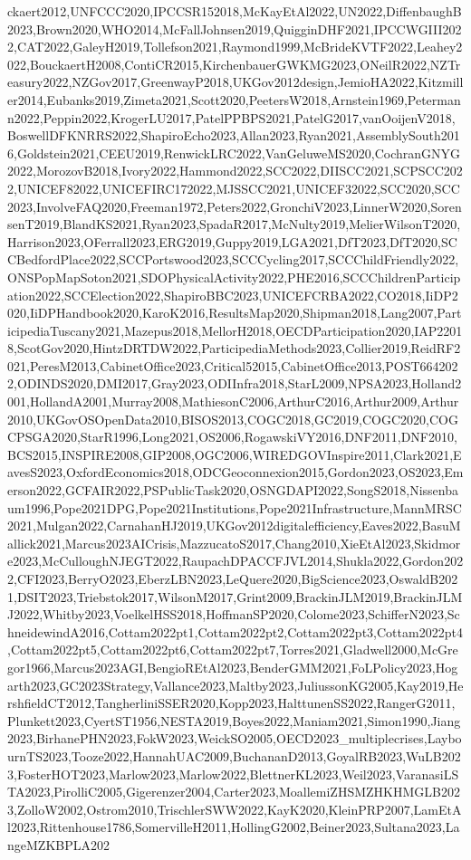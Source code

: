 \documentclass[a4paper]{article} %
\begin{document}
\begin{refsection}
ckaert2012,UNFCCC2020,IPCCSR152018,McKayEtAl2022,UN2022,DiffenbaughB2023,Brown2020,WHO2014,McFallJohnsen2019,QuigginDHF2021,IPCCWGIII2022,CAT2022,GaleyH2019,Tollefson2021,Raymond1999,McBrideKVTF2022,Leahey2022,BouckaertH2008,ContiCR2015,KirchenbauerGWKMG2023,ONeilR2022,NZTreasury2022,NZGov2017,GreenwayP2018,UKGov2012design,JemioHA2022,Kitzmiller2014,Eubanks2019,Zimeta2021,Scott2020,PeetersW2018,Arnstein1969,Petermann2022,Peppin2022,KrogerLU2017,PatelPPBPS2021,PatelG2017,vanOoijenV2018,BoswellDFKNRRS2022,ShapiroEcho2023,Allan2023,Ryan2021,AssemblySouth2016,Goldstein2021,CEEU2019,RenwickLRC2022,VanGeluweMS2020,CochranGNYG2022,MorozovB2018,Ivory2022,Hammond2022,SCC2022,DIISCC2021,SCPSCC2022,UNICEF82022,UNICEFIRC172022,MJSSCC2021,UNICEF32022,SCC2020,SCC2023,InvolveFAQ2020,Freeman1972,Peters2022,GronchiV2023,LinnerW2020,SorensenT2019,BlandKS2021,Ryan2023,SpadaR2017,McNulty2019,MelierWilsonT2020,Harrison2023,OFerrall2023,ERG2019,Guppy2019,LGA2021,DfT2023,DfT2020,SCCBedfordPlace2022,SCCPortswood2023,SCCCycling2017,SCCChildFriendly2022,ONSPopMapSoton2021,SDOPhysicalActivity2022,PHE2016,SCCChildrenParticipation2022,SCCElection2022,ShapiroBBC2023,UNICEFCRBA2022,CO2018,IiDP2020,IiDPHandbook2020,KaroK2016,ResultsMap2020,Shipman2018,Lang2007,ParticipediaTuscany2021,Mazepus2018,MellorH2018,OECDParticipation2020,IAP22018,ScotGov2020,HintzDRTDW2022,ParticipediaMethods2023,Collier2019,ReidRF2021,PeresM2013,CabinetOffice2023,Critical52015,CabinetOffice2013,POST6642022,ODINDS2020,DMI2017,Gray2023,ODIInfra2018,StarL2009,NPSA2023,Holland2001,HollandA2001,Murray2008,MathiesonC2006,ArthurC2016,Arthur2009,Arthur2010,UKGovOSOpenData2010,BISOS2013,COGC2018,GC2019,COGC2020,COGCPSGA2020,StarR1996,Long2021,OS2006,RogawskiVY2016,DNF2011,DNF2010,BCS2015,INSPIRE2008,GIP2008,OGC2006,WIREDGOVInspire2011,Clark2021,EavesS2023,OxfordEconomics2018,ODCGeoconnexion2015,Gordon2023,OS2023,Emerson2022,GCFAIR2022,PSPublicTask2020,OSNGDAPI2022,SongS2018,Nissenbaum1996,Pope2021DPG,Pope2021Institutions,Pope2021Infrastructure,MannMRSC2021,Mulgan2022,CarnahanHJ2019,UKGov2012digitalefficiency,Eaves2022,BasuMallick2021,Marcus2023AICrisis,MazzucatoS2017,Chang2010,XieEtAl2023,Skidmore2023,McCulloughNJEGT2022,RaupachDPACCFJVL2014,Shukla2022,Gordon2022,CFI2023,BerryO2023,EberzLBN2023,LeQuere2020,BigScience2023,OswaldB2021,DSIT2023,Triebstok2017,WilsonM2017,Grint2009,BrackinJLM2019,BrackinJLMJ2022,Whitby2023,VoelkelHSS2018,HoffmanSP2020,Colome2023,SchifferN2023,SchneidewindA2016,Cottam2022pt1,Cottam2022pt2,Cottam2022pt3,Cottam2022pt4,Cottam2022pt5,Cottam2022pt6,Cottam2022pt7,Torres2021,Gladwell2000,McGregor1966,Marcus2023AGI,BengioREtAl2023,BenderGMM2021,FoLPolicy2023,Hogarth2023,GC2023Strategy,Vallance2023,Maltby2023,JuliussonKG2005,Kay2019,HershfieldCT2012,TangherliniSSER2020,Kopp2023,HalttunenSS2022,RangerG2011,Plunkett2023,CyertST1956,NESTA2019,Boyes2022,Maniam2021,Simon1990,Jiang2023,BirhanePHN2023,FokW2023,WeickSO2005,OECD2023_multiplecrises,LaybournTS2023,Tooze2022,HannahUAC2009,BuchananD2013,GoyalRB2023,WuLB2023,FosterHOT2023,Marlow2023,Marlow2022,BlettnerKL2023,Weil2023,VaranasiLSTA2023,PirolliC2005,Gigerenzer2004,Carter2023,MoallemiZHSMZHKHMGLB2023,ZolloW2002,Ostrom2010,TrischlerSWW2022,KayK2020,KleinPRP2007,LamEtAl2023,Rittenhouse1786,SomervilleH2011,HollingG2002,Beiner2023,Sultana2023,LangeMZKBPLA202
\end{refsection}
\end{document}
